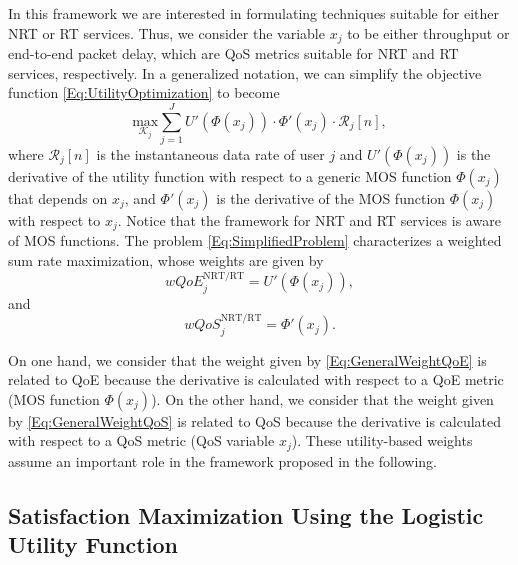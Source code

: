 \documentclass[conference]{IEEEtran}
\begin{document}
In this framework we are interested in formulating techniques suitable for either \ac{NRT} or \ac{RT} services. Thus, we consider the variable $x_j$ to be either throughput or end-to-end packet delay, which are \ac{QoS} metrics suitable for \ac{NRT} and \ac{RT} services, respectively. In a generalized notation, we can simplify the objective function \eqref{Eq:UtilityOptimization} to become
%
\begin{equation}
\label{Eq:SimplifiedProblem}
\underset{\mathcal{K}_j}{\text{max}}\sum_{j=1}^{J} U'\left(\Phi(x_j)\right)\cdot \Phi'(x_j) \cdot \mathcal{R}_j[n],
\end{equation}
where $\mathcal{R}_j[n]$ is the instantaneous data rate of user $j$ and $U'\left(\Phi(x_j)\right)$ is the derivative of the utility function with respect to a generic \ac{MOS} function $\Phi(x_j)$  that depends on $x_j$, and  $\Phi'(x_j)$ is the derivative of the \ac{MOS} function $\Phi(x_j)$ with respect to $ x_j $. Notice that the framework  for \ac{NRT} and \ac{RT} services is aware of \ac{MOS} functions. The problem \eqref{Eq:SimplifiedProblem}  characterizes a weighted sum rate maximization, whose weights are given by
\begin{equation}
\label{Eq:GeneralWeightQoE}
wQoE_{j}^\text{NRT/RT} = U'(\Phi(x_j)),
\end{equation} 
and 
\begin{equation}
\label{Eq:GeneralWeightQoS}	
wQoS_{j}^\text{NRT/RT} = \Phi'(x_j).
\end{equation} 

On one hand, we consider that the weight given by \eqref{Eq:GeneralWeightQoE} is related to QoE because the derivative is calculated with respect to a \ac{QoE} metric (\ac{MOS} function $\Phi(x_j)$). On the other hand, we consider that the weight given by \eqref{Eq:GeneralWeightQoS} is related to \ac{QoS} because the derivative is calculated with respect to a \ac{QoS} metric (\ac{QoS} variable $x_j$). These utility-based weights assume an important role in the framework proposed in the following.

\subsection{Satisfaction Maximization Using the Logistic Utility Function}
\label{Sec:maxUtil}
\end{document}
